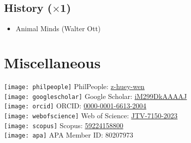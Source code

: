 \documentclass[10pt]{article}
\begin{document}
\subsection*{History (\begin{math}\times\end{math}1)}

\begin{itemize}
\item Animal Minds (Walter Ott)
\end{itemize}

\section*{Miscellaneous}

\begin{multicols}{2}
\texttt{[image: philpeople]} \hspace*{\fill}PhilPeople: \href{https://philpeople.org/profiles/z-huey-wen}{z-huey-wen}\\
\texttt{[image: googlescholar]} \hspace*{\fill}Google Scholar: \href{https://scholar.google.com/citations?hl=en&user=iM299DkAAAAJ}{iM299DkAAAAJ}\\
\texttt{[image: orcid]} \hspace*{\fill}ORCID: \href{https://orcid.org/0000-0001-6613-2004}{0000-0001-6613-2004}\\
\texttt{[image: webofscience]} \hspace*{\fill}Web of Science: \href{https://www.webofscience.com/wos/author/record/JTV-7150-2023}{JTV-7150-2023}\\
\texttt{[image: scopus]} \hspace*{\fill}Scopus: \href{https://www.scopus.com/authid/detail.uri?authorId=59224158800}{59224158800}\\\texttt{[image: apa]} \hspace*{\fill}APA Member ID: 80207973
\end{multicols}
\end{document}

